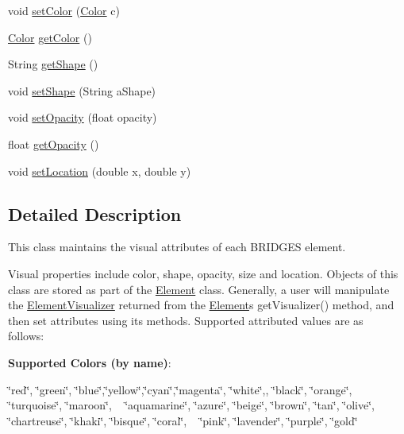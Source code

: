\begin{DoxyCompactItemize}
\item 
void \hyperlink{classbridges_1_1base_1_1_element_visualizer_a33172ab908f3b6f9740727b0bfe91565}{set\+Color} (\hyperlink{classbridges_1_1base_1_1_color}{Color} c)
\item 
\hyperlink{classbridges_1_1base_1_1_color}{Color} \hyperlink{classbridges_1_1base_1_1_element_visualizer_a3bf821b9bfa02746882bac934ce4fb8e}{get\+Color} ()
\item 
String \hyperlink{classbridges_1_1base_1_1_element_visualizer_a8ef0825745e49f32b57e4bf6c891b57e}{get\+Shape} ()
\item 
void \hyperlink{classbridges_1_1base_1_1_element_visualizer_ac3bad991904c8ad23e5233b341381d93}{set\+Shape} (String a\+Shape)
\item 
void \hyperlink{classbridges_1_1base_1_1_element_visualizer_a932f62eb1bd0c92da265a7f903dd0790}{set\+Opacity} (float opacity)
\item 
float \hyperlink{classbridges_1_1base_1_1_element_visualizer_ab86ff39f17f8d1766670b18be88b5492}{get\+Opacity} ()
\item 
void \hyperlink{classbridges_1_1base_1_1_element_visualizer_a04f3416447f2042de7cd21ce5b6a0598}{set\+Location} (double x, double y)
\end{DoxyCompactItemize}


\subsection{Detailed Description}
This class maintains the visual attributes of each B\+R\+I\+D\+G\+E\+S element. 

Visual properties include color, shape, opacity, size and location. Objects of this class are stored as part of the \hyperlink{classbridges_1_1base_1_1_element}{Element} class. Generally, a user will manipulate the \hyperlink{classbridges_1_1base_1_1_element_visualizer}{Element\+Visualizer} returned from the \hyperlink{classbridges_1_1base_1_1_element}{Element}\textquotesingle{}s get\+Visualizer() method, and then set attributes using its methods. Supported attributed values are as follows\+:~\newline


{\bfseries Supported Colors (by name)}\+: 

\char`\"{}red\char`\"{}, \char`\"{}green\char`\"{}, \char`\"{}blue\char`\"{},\char`\"{}yellow\char`\"{},\char`\"{}cyan\char`\"{},\char`\"{}magenta\char`\"{}, \char`\"{}white\char`\"{},, \char`\"{}black\char`\"{}, \char`\"{}orange\char`\"{}, \char`\"{}turquoise\char`\"{}, \char`\"{}maroon\char`\"{}, ~\newline
 \char`\"{}aquamarine\char`\"{}, \char`\"{}azure\char`\"{}, \char`\"{}beige\char`\"{}, \char`\"{}brown\char`\"{}, \char`\"{}tan\char`\"{}, \char`\"{}olive\char`\"{}, \char`\"{}chartreuse\char`\"{}, \char`\"{}khaki\char`\"{}, \char`\"{}bisque\char`\"{}, \char`\"{}coral\char`\"{}, ~\newline
 \char`\"{}pink\char`\"{}, \char`\"{}lavender\char`\"{}, \char`\"{}purple\char`\"{}, \char`\"{}gold\char`\"{} 

